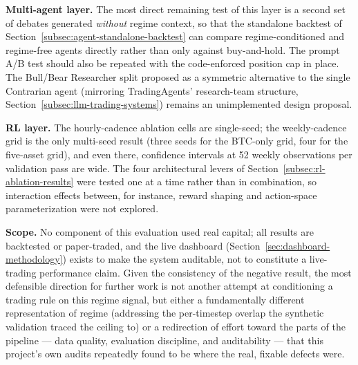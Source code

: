\textbf{Multi-agent layer.} The most direct remaining test of this layer is a second set of debates generated \emph{without} regime context, so that the standalone backtest of Section~\ref{subsec:agent-standalone-backtest} can compare regime-conditioned and regime-free agents directly rather than only against buy-and-hold. The prompt A/B test should also be repeated with the code-enforced position cap in place. The Bull/Bear Researcher split proposed as a symmetric alternative to the single Contrarian agent (mirroring TradingAgents' research-team structure, Section~\ref{subsec:llm-trading-systems}) remains an unimplemented design proposal.

\textbf{RL layer.} The hourly-cadence ablation cells are single-seed; the weekly-cadence grid is the only multi-seed result (three seeds for the BTC-only grid, four for the five-asset grid), and even there, confidence intervals at 52 weekly observations per validation pass are wide. The four architectural levers of Section~\ref{subsec:rl-ablation-results} were tested one at a time rather than in combination, so interaction effects between, for instance, reward shaping and action-space parameterization were not explored.

\textbf{Scope.} No component of this evaluation used real capital; all results are backtested or paper-traded, and the live dashboard (Section~\ref{sec:dashboard-methodology}) exists to make the system auditable, not to constitute a live-trading performance claim. Given the consistency of the negative result, the most defensible direction for further work is not another attempt at conditioning a trading rule on this regime signal, but either a fundamentally different representation of regime (addressing the per-timestep overlap the synthetic validation traced the ceiling to) or a redirection of effort toward the parts of the pipeline --- data quality, evaluation discipline, and auditability --- that this project's own audits repeatedly found to be where the real, fixable defects were.
